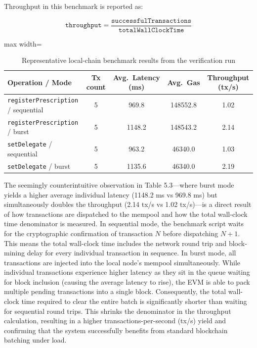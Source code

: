\documentclass[12pt,a4wide]{report}
\begin{document}
Throughput in this benchmark is reported as:

\[
\mathtt{throughput} = \frac{\mathtt{successfulTransactions}}{\mathtt{totalWallClockTime}}
\]

\begin{table}[H]
\centering
\caption{Representative local-chain benchmark results from the verification run}
\label{tab:anvil-load}
\begin{adjustbox}{max width=\textwidth}
\begin{tabular}{@{}lcccc@{}}
\toprule
\textbf{Operation / Mode} & \textbf{Tx count} & \textbf{Avg.\ Latency (ms)} & \textbf{Avg.\ Gas} & \textbf{Throughput (tx/s)} \\
\midrule
\texttt{registerPrescription} / sequential & 5 & 969.8 & 148552.8 & 1.02 \\
\texttt{registerPrescription} / burst      & 5 & 1148.2 & 148543.2 & 2.14 \\
\texttt{setDelegate} / sequential          & 5 & 963.2 & 46340.0 & 1.03 \\
\texttt{setDelegate} / burst               & 5 & 1135.6 & 46340.0 & 2.19 \\
\bottomrule
\end{tabular}
\end{adjustbox}
\end{table}


The seemingly counterintuitive observation in Table 5.3---where burst mode yields a higher average individual latency (1148.2 ms vs 969.8 ms) but simultaneously doubles the throughput (2.14 tx/s vs 1.02 tx/s)---is a direct result of how transactions are dispatched to the mempool and how the total wall-clock time denominator is measured. In sequential mode, the benchmark script waits for the cryptographic confirmation of transaction $N$ before dispatching $N+1$. This means the total wall-clock time includes the network round trip and block-mining delay for every individual transaction in sequence. In burst mode, all transactions are injected into the local node's mempool simultaneously. While individual transactions experience higher latency as they sit in the queue waiting for block inclusion (causing the average latency to rise), the EVM is able to pack multiple pending transactions into a single block. Consequently, the total wall-clock time required to clear the entire batch is significantly shorter than waiting for sequential round trips. This shrinks the denominator in the throughput calculation, resulting in a higher transactions-per-second (tx/s) yield and confirming that the system successfully benefits from standard blockchain batching under load.
\end{document}
